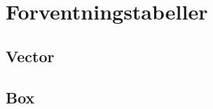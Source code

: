 \section{Forventningstabeller}
\label{sec:forventningstabeller}
	\subsection{Vector}
	

	\subsection{Box}
	